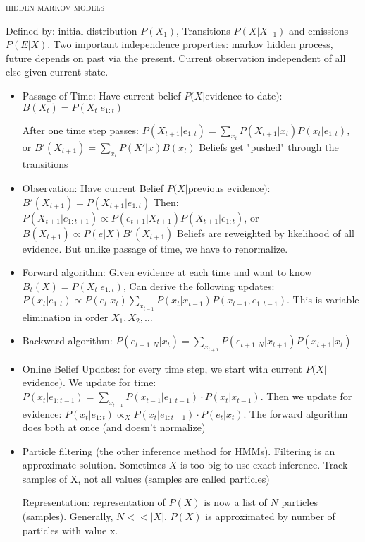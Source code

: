 \documentclass[10pt,twocolumn]{article}
\begin{document}
\begin{center}\textsc{hidden markov models}\end{center} 
	Defined by: initial distribution $P(X_1)$, Transitions $P(X|X_{-1})$ and emissions $P(E|X)$.  Two important independence properties: markov hidden process, future depends on past via the present. Current observation independent of all else given current state.
	\begin{itemize}
		\item Passage of Time: Have current belief $P(X|$evidence to date$)$: $B(X_t)=P(X_t|e_{1:t})$
		
		After one time step passes: $P(X_{t+1}|e_{1:t})=\displaystyle\sum_{x_t}P(X_{t+1}|x_t)P(x_t|e_{1:t})$, or
		$B'(X_{t+1})=\displaystyle\sum_{x_t}P(X'|x)B(x_t)$
		Beliefs get "pushed" through the transitions
		
	\item Observation: Have current Belief $P(X|$previous evidence$)$: $B'(X_{t+1})=P(X_{t+1}|e_{1:t})$
	Then: $P(X_{t+1}|e_{1:t+1})\propto P(e_{t+1}|X_{t+1})P(X_{t+1}|e_{1:t})$, or
	$B(X_{t+1})\propto P(e|X)B'(X_{t+1})$
	Beliefs are reweighted by likelihood of all evidence. But unlike passage of time, we have to renormalize.
	\item Forward algorithm: Given evidence at each time and want to know $B_t(X)=P(X_t|e_{1:t})$, Can derive the following updates: $P(x_t|e_{1:t})\propto P(e_t|x_t)\displaystyle\sum_{x_{t-1}}P(x_t|x_{t-1})P(x_{t-1},e_{1:t-1})$. This is variable elimination in order $X_1,X_2,\ldots$
	\item Backward algorithm: $P(e_{t+1:N}|x_t)=\displaystyle\sum_{x_{t+1}}P(e_{t+1:N}|x_{t+1})P(x_{t+1}|x_t)$
	\item Online Belief Updates: for every time step, we start with current $P(X|$evidence$)$. We update for time: $P(x_t|e_{1:t-1})=\displaystyle\sum_{x_{t-1}}P(x_{t-1}|e_{1:t-1})\cdot P(x_t|x_{t-1})$. Then we update for evidence: $P(x_t|e_{1:t})\propto_XP(x_t|e_{1:t-1})\cdot P(e_t|x_t)$. The forward algorithm does both at once (and doesn't normalize)
	\item Particle filtering (the other inference method for HMMs). Filtering is an approximate solution. Sometimes $X$ is too big to use exact inference. Track samples of X, not all values (samples are called particles)

		 Representation: representation of $P(X)$ is now a list of $N$ particles (samples). Generally, $N<<|X|$. $P(X)$ is approximated by number of particles with value x.
		

\end{itemize}
\end{document}
